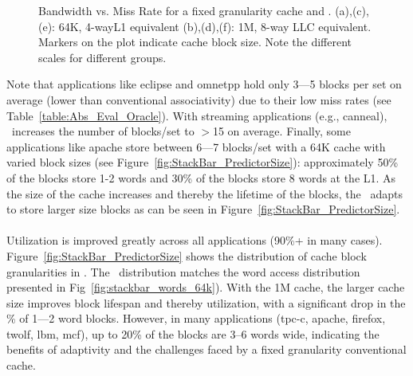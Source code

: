 {\begin{figure}[ht]

  \caption[Bandwidth vs. Miss Rate]{Bandwidth vs. Miss Rate for a fixed granularity cache and \AC{}. (a),(c),(e): 64K, 4-wayL1 equivalent (b),(d),(f): 1M, 8-way LLC equivalent.  Markers on the plot indicate cache block size. Note the different scales for different groups.}
  \label{fig:eval_scatter_bw_64k_1m}
\end{figure}

\clearpage



Note that applications like eclipse and omnetpp hold only 3---5 blocks per set on average (lower than conventional associativity) due to their low miss rates (see Table~\ref{table:Abs_Eval_Oracle}). With streaming applications (e.g., canneal), \AC\ increases the number of blocks/set to $>$15 on average. Finally, some applications like apache store between 6---7 blocks/set with a 64K cache with varied block sizes (see Figure~\ref{fig:StackBar_PredictorSize}): approximately 50\% of the blocks store 1-2 words and 30\% of the blocks store 8 words at the L1. As the size of the cache increases and thereby the lifetime of the blocks, the \AC\ adapts to store larger size blocks as can be seen in Figure~\ref{fig:StackBar_PredictorSize}.
\\ \\
\indent Utilization is improved greatly across all applications (90\%+ in many cases). Figure~\ref{fig:StackBar_PredictorSize} shows the distribution of cache block granularities in \AC{}. The \AB\ distribution matches the word access distribution presented in Fig~\ref{fig:stackbar_words_64k}). With the 1M cache, the larger cache size improves block lifespan and thereby utilization, with a significant drop in the \% of 1---2 word blocks. However, in many applications (tpc-c, apache, firefox, twolf, lbm, mcf), up to 20\% of the blocks are 3--6 words wide, indicating the benefits of adaptivity and the challenges faced by a fixed granularity conventional cache.

}
